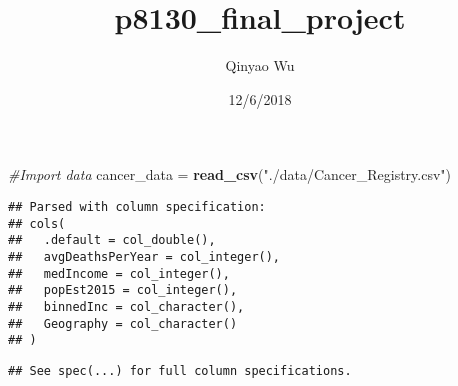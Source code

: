 \documentclass[]{article}
\title{p8130\_final\_project}
\author{Qinyao Wu}
\date{12/6/2018}
\newenvironment{Shaded}{\begin{snugshade}}{\end{snugshade}}
\newcommand{\KeywordTok}[1]{\textcolor[rgb]{0.13,0.29,0.53}{\textbf{#1}}}
\newcommand{\DataTypeTok}[1]{\textcolor[rgb]{0.13,0.29,0.53}{#1}}
\newcommand{\DecValTok}[1]{\textcolor[rgb]{0.00,0.00,0.81}{#1}}
\newcommand{\StringTok}[1]{\textcolor[rgb]{0.31,0.60,0.02}{#1}}
\newcommand{\CommentTok}[1]{\textcolor[rgb]{0.56,0.35,0.01}{\textit{#1}}}
\newcommand{\ControlFlowTok}[1]{\textcolor[rgb]{0.13,0.29,0.53}{\textbf{#1}}}
\newcommand{\OperatorTok}[1]{\textcolor[rgb]{0.81,0.36,0.00}{\textbf{#1}}}
\newcommand{\NormalTok}[1]{#1}
\begin{document}
\maketitle

\begin{Shaded}
\begin{Highlighting}[]
\CommentTok{#Import data}
\NormalTok{cancer_data =}\StringTok{ }\KeywordTok{read_csv}\NormalTok{(}\StringTok{"./data/Cancer_Registry.csv"}\NormalTok{) }
\end{Highlighting}
\end{Shaded}

\begin{verbatim}
## Parsed with column specification:
## cols(
##   .default = col_double(),
##   avgDeathsPerYear = col_integer(),
##   medIncome = col_integer(),
##   popEst2015 = col_integer(),
##   binnedInc = col_character(),
##   Geography = col_character()
## )
\end{verbatim}

\begin{verbatim}
## See spec(...) for full column specifications.
\end{verbatim}

\begin{Shaded}
\end{Shaded}
\end{document}
